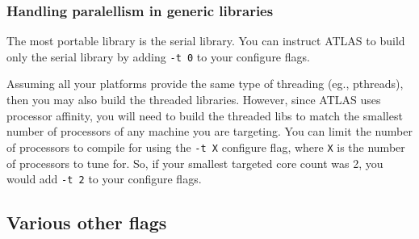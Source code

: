 \documentclass[11pt]{article}
\newcommand{\Wskip}[1]{ }
\begin{document}
\subsubsection{Handling paralellism in generic libraries}
The most portable library is the serial library.  You can instruct ATLAS
to build only the serial library by adding \verb+-t 0+ to your configure
flags.

Assuming all your platforms provide the same type of threading (eg., pthreads),
then you may also build the threaded libraries.  However, since ATLAS uses
processor affinity, you will need to build the threaded libs to match the
smallest number of processors of any machine you are targeting.  You can
limit the number of processors to compile for using the \verb+-t X+
configure flag, where \verb+X+ is the number of processors to tune for.
So, if your smallest targeted core count was 2, you would add \verb+-t 2+
to your configure flags.

\Wskip{
\subsection{Kludging an install to workaround the gfortran/x87 compiler bug}
\label{sec-gf77err}
ATLAS defaults to using gcc/gfortran 4.6, which unfortunately has a
compiler bug when using the x87 unit.  In this case, the Fortran77
BLAS and LAPACK testers must be compiled with low optimization, or
they will (erroneously) show failures in every routine.  In order to
get around this problem, install as normal, but do not issue the 
\verb+make check+ or any other testing command.  \underline{After}
the build is complete, edit your {\tt Make.inc}, and scope the
\verb+F77FLAGS+ macro.  If it has the flag \verb+-mfpmath=387+ anywhere
in it, then you must append \verb+-O1+ to it in order for gfortran 4.6
to properly compile the testers.
If you make this change before the
build, it will slow down all Fortran routines (eg., many lapack routines),
which does not seem necessary to defeat the compiler bug.
}

\subsection{Various other flags}
\label{sec-flag-other}
\end{document}
